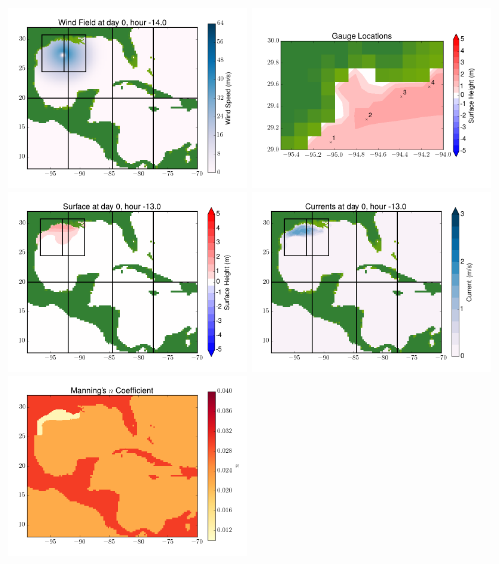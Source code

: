 \documentclass[11pt]{article}
\begin{document}
\vskip 10pt 
\includegraphics[width=0.475\textwidth]{frame0058fig9.png}
\includegraphics[width=0.475\textwidth]{frame0058fig10.png}
\vskip 10pt 
\includegraphics[width=0.475\textwidth]{frame0059fig1.png}
\includegraphics[width=0.475\textwidth]{frame0059fig2.png}
\vskip 10pt 
\includegraphics[width=0.475\textwidth]{frame0059fig3.png}
\end{document}
